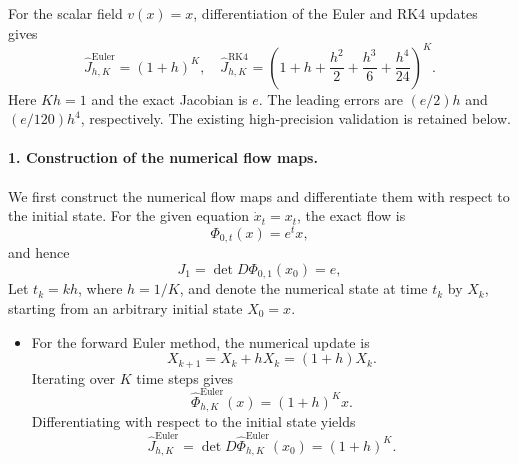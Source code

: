 \documentclass[12pt,a4paper,oneside]{book}
\begin{document}
\begin{solution}

For the scalar field $v(x)=x$, differentiation of the Euler and RK4 updates gives
\begin{equation*}
    \widehat J_{h,K}^{\mathrm{Euler}}=(1+h)^K,\quad
    \widehat J_{h,K}^{\mathrm{RK4}}=
    \left(1+h+\frac{h^2}{2}+\frac{h^3}{6}+\frac{h^4}{24}\right)^K.
\end{equation*}
Here $Kh=1$ and the exact Jacobian is $e$. The leading errors are $(e/2)h$ and $(e/120)h^4$, respectively. The existing
high-precision validation is retained below.

\paragraph{1. Construction of the numerical flow maps.}

We first construct the numerical flow maps and differentiate them with respect to the initial state. For the given equation
$\dot x_t=x_t$, the exact flow is
\begin{equation*}
    \Phi_{0,t}(x)=e^t x,
\end{equation*}
and hence
\begin{equation*}
    J_1=\det D\Phi_{0,1}(x_0)=e,
\end{equation*}
Let $t_k=kh$, where $h=1/K$, and denote the numerical state at time $t_k$ by $X_k$, starting from an arbitrary initial
state $X_0=x$.
\begin{itemize}
    \item For the forward Euler method, the numerical update is
        \begin{equation*}
            X_{k+1}=X_k+hX_k=(1+h)X_k.
        \end{equation*}
        Iterating over $K$ time steps gives
        \begin{equation*}
            \widehat\Phi_{h,K}^{\mathrm{Euler}}(x) = (1+h)^Kx.
        \end{equation*}
        Differentiating with respect to the initial state yields
        \begin{equation*}
            \widehat J_{h,K}^{\mathrm{Euler}}
            = \det D\widehat\Phi_{h,K}^{\mathrm{Euler}}(x_0)
            = (1+h)^K.
        \end{equation*}


\end{itemize}
\end{solution}
\end{document}
